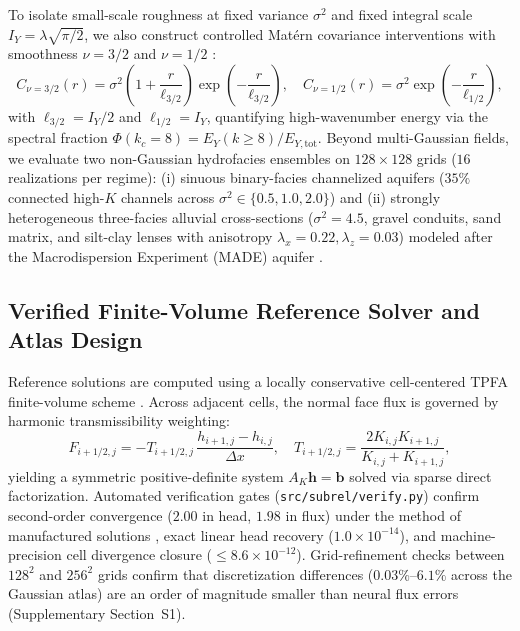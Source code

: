 \documentclass[preprint,12pt,authoryear]{elsarticle}
\begin{document}
To isolate small-scale roughness at fixed variance $\sigma^2$ and fixed integral scale $I_Y = \lambda\sqrt{\pi/2}$, we also construct controlled Mat\'{e}rn covariance interventions with smoothness $\nu = 3/2$ and $\nu = 1/2$ \citep{rubin2003applied}:
\begin{equation}
  C_{\nu=3/2}(r) = \sigma^2 \left(1 + \frac{r}{\ell_{3/2}}\right)\exp\!\left(-\frac{r}{\ell_{3/2}}\right), \quad
  C_{\nu=1/2}(r) = \sigma^2 \exp\!\left(-\frac{r}{\ell_{1/2}}\right),
  \label{eq:matern_cov}
\end{equation}
with $\ell_{3/2} = I_Y / 2$ and $\ell_{1/2} = I_Y$, quantifying high-wavenumber energy via the spectral fraction $\Phi(k_c = 8) = E_Y(k \ge 8) / E_{Y,\text{tot}}$. Beyond multi-Gaussian fields, we evaluate two non-Gaussian hydrofacies ensembles on $128 \times 128$ grids ($16$ realizations per regime): (i) sinuous binary-facies channelized aquifers ($35\%$ connected high-$K$ channels across $\sigma^2 \in \{0.5, 1.0, 2.0\}$) and (ii) strongly heterogeneous three-facies alluvial cross-sections ($\sigma^2 = 4.5$, gravel conduits, sand matrix, and silt-clay lenses with anisotropy $\lambda_x = 0.22, \lambda_z = 0.03$) modeled after the Macrodispersion Experiment (MADE) aquifer \citep{zheng2011made}.

\subsection{Verified Finite-Volume Reference Solver and Atlas Design}
\label{sec:fv_solver}

Reference solutions are computed using a locally conservative cell-centered TPFA finite-volume scheme \citep{eymard2000}. Across adjacent cells, the normal face flux is governed by harmonic transmissibility weighting:
\begin{equation}
  F_{i+1/2, j} = -T_{i+1/2, j}\,\frac{h_{i+1, j} - h_{i, j}}{\Delta x}, \quad
  T_{i+1/2, j} = \frac{2 K_{i, j} K_{i+1, j}}{K_{i, j} + K_{i+1, j}},
  \label{eq:tpfa}
\end{equation}
yielding a symmetric positive-definite system $A_K \mathbf{h} = \mathbf{b}$ solved via sparse direct factorization. Automated verification gates (\texttt{src/subrel/verify.py}) confirm second-order convergence ($2.00$ in head, $1.98$ in flux) under the method of manufactured solutions \citep{roache1998}, exact linear head recovery ($1.0 \times 10^{-14}$), and machine-precision cell divergence closure ($\le 8.6 \times 10^{-12}$). Grid-refinement checks between $128^2$ and $256^2$ grids confirm that discretization differences ($0.03\%$--$6.1\%$ across the Gaussian atlas) are an order of magnitude smaller than neural flux errors (Supplementary Section~S1).
\end{document}
